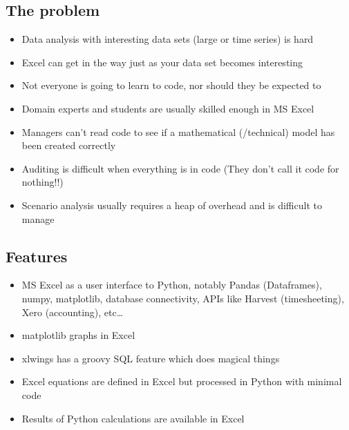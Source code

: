 \documentclass[12pt,a4paper,twoside,openright,titlepage]{article}
\begin{document}
\subsection{The problem}
\begin{itemize}
	\item Data analysis with interesting data sets (large or time series) is hard
	\item Excel can get in the way just as your data set becomes interesting
	\item Not everyone is going to learn to code, nor should they be expected to
	\item Domain experts and students are usually skilled enough in MS Excel
	\item Managers can't read code to see if a mathematical (/technical) model has been created correctly
	\item Auditing is difficult when everything is in code (They don't call it code for nothing!!)
	\item Scenario analysis usually requires a heap of overhead and is difficult to manage

\end{itemize}

\subsection{Features}
\begin{itemize}
	\item MS Excel as a user interface to Python, notably Pandas (Dataframes), numpy, matplotlib, database connectivity, APIs like Harvest (timesheeting), Xero (accounting), etc\ldots
	\item matplotlib graphs in Excel
	\item xlwings has a groovy SQL feature which does magical things
	\item Excel equations are defined in Excel but processed in Python with minimal code
	\item Results of Python calculations are available in Excel
\end{itemize}
\end{document}

